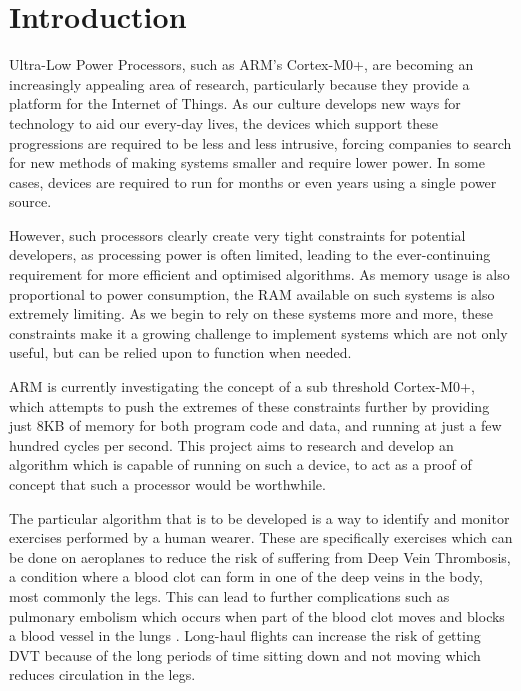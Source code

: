 \chapter{Introduction}

Ultra-Low Power Processors, such as ARM's Cortex-M0+, are becoming an increasingly appealing area of research, particularly because they provide a platform for the Internet of Things. As our culture develops new ways for technology to aid our every-day lives, the devices which support these progressions are required to be less and less intrusive, forcing companies to search for new methods of making systems smaller and require lower power. In some cases, devices are required to run for months or even years using a single power source.

However, such processors clearly create very tight constraints for potential developers, as processing power is often limited, leading to the ever-continuing requirement for more efficient and optimised algorithms. As memory usage is also proportional to power consumption, the RAM available on such systems is also extremely limiting. As we begin to rely on these systems more and more, these constraints make it a growing challenge to implement systems which are not only useful, but can be relied upon to function when needed.

ARM is currently investigating the concept of a sub threshold Cortex-M0+, which attempts to push the extremes of these constraints further by providing just 8KB of memory for both program code and data, and running at just a few hundred cycles per second. This project aims to research and develop an algorithm which is capable of running on such a device, to act as a proof of concept that such a processor would be worthwhile.


The particular algorithm that is to be developed is a way to identify and monitor exercises performed by a human wearer. These are specifically exercises which can be done on aeroplanes to reduce the risk of suffering from Deep Vein Thrombosis, a condition where a blood clot can form in one of the deep veins in the body, most commonly the legs. This can lead to further complications such as pulmonary embolism which occurs when part of the blood clot moves and blocks a blood vessel in the lungs \cite{NHS2014DVT}. Long-haul flights can increase the risk of getting DVT because of the long periods of time sitting down and not moving which reduces circulation in the legs.

